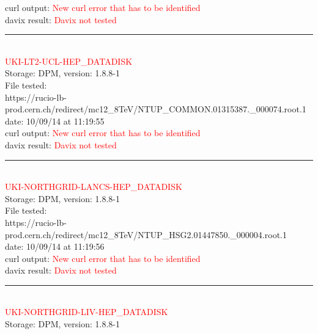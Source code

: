 curl output:  \textcolor{red}{New curl error that has to be identified}\\

davix result:  \textcolor{red}{Davix not tested}\\

\rule{\textwidth}{1pt}\\

\textcolor{red}{\normalsize{UKI-LT2-UCL-HEP\_DATADISK}}\\

Storage: DPM, version: 1.8.8-1\\

File tested:\\
\footnotesize{https://rucio-lb-prod.cern.ch/redirect/mc12\_8TeV/NTUP\_COMMON.01315387.\_000074.root.1}\\

date: 10/09/14 at 11:19:55\\

curl output:  \textcolor{red}{New curl error that has to be identified}\\

davix result:  \textcolor{red}{Davix not tested}\\

\rule{\textwidth}{1pt}\\

\textcolor{red}{\normalsize{UKI-NORTHGRID-LANCS-HEP\_DATADISK}}\\

Storage: DPM, version: 1.8.8-1\\

File tested:\\
\footnotesize{https://rucio-lb-prod.cern.ch/redirect/mc12\_8TeV/NTUP\_HSG2.01447850.\_000004.root.1}\\

date: 10/09/14 at 11:19:56\\

curl output:  \textcolor{red}{New curl error that has to be identified}\\

davix result:  \textcolor{red}{Davix not tested}\\

\rule{\textwidth}{1pt}\\

\textcolor{red}{\normalsize{UKI-NORTHGRID-LIV-HEP\_DATADISK}}\\

Storage: DPM, version: 1.8.8-1\\

